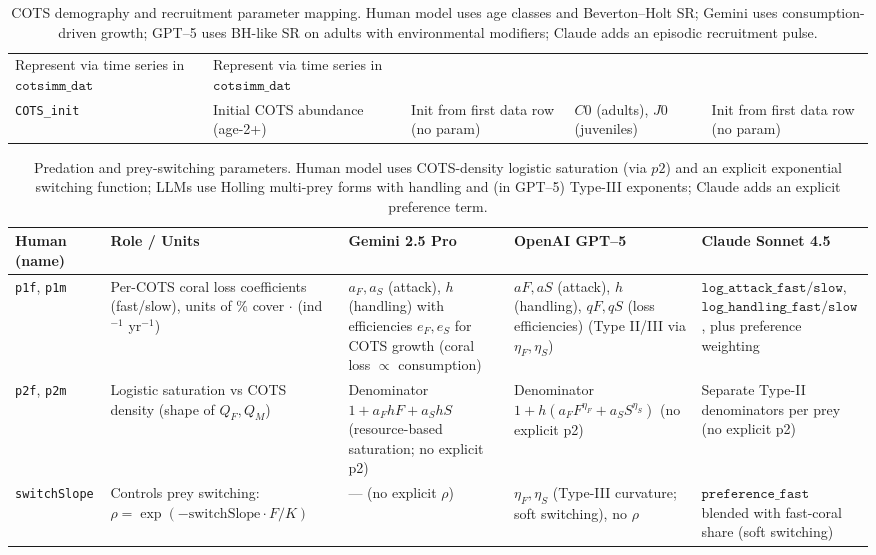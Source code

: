 \begin{landscape}
\begin{table}[htbp]
\begin{tabularx}{\linewidth}{@{}l l l l X@{}}
Represent via time series in $\texttt{cotsimm\_dat}$ &
Represent via time series in $\texttt{cotsimm\_dat}$ \\
\texttt{COTS\_init} & Initial COTS abundance (age-2+) &
Init from first data row (no param) &
$C0$ (adults), $J0$ (juveniles) &
Init from first data row (no param) \\
\bottomrule
\end{tabularx}
\caption{COTS demography and recruitment parameter mapping. Human model uses age classes and Beverton--Holt SR; Gemini uses consumption-driven growth; GPT--5 uses BH-like SR on adults with environmental modifiers; Claude adds an episodic recruitment pulse.}
\label{tab:params_cots}
\end{table}
\end{landscape}

\begin{landscape}
\begin{table}[htbp]
\centering
\footnotesize
\renewcommand{\arraystretch}{1.15}
\setlength{\tabcolsep}{3pt}
\begin{tabularx}{\linewidth}{@{}l l l l X@{}}
\toprule
\textbf{Human (name)} & \textbf{Role / Units} & \textbf{Gemini 2.5 Pro} & \textbf{OpenAI GPT--5} & \textbf{Claude Sonnet 4.5} \\
\midrule
\texttt{p1f}, \texttt{p1m} & Per-COTS coral loss coefficients (fast/slow), units of \% cover $\cdot$ (ind$^{-1}$ yr$^{-1}$) &
$a_F,a_S$ (attack), $h$ (handling) with efficiencies $e_F,e_S$ for COTS growth (coral loss $\propto$ consumption) &
$aF,aS$ (attack), $h$ (handling), $qF,qS$ (loss efficiencies) \quad(Type II/III via $\eta_F,\eta_S$) &
$\texttt{log\_attack\_fast/slow}$, $\texttt{log\_handling\_fast/slow}$, plus preference weighting \\
\texttt{p2f}, \texttt{p2m} & Logistic saturation vs COTS density (shape of $Q_F,Q_M$) &
Denominator $1+a_FhF+a_ShS$ (resource-based saturation; no explicit p2) &
Denominator $1+h(a_FF^{\eta_F}+a_SS^{\eta_S})$ (no explicit p2) &
Separate Type-II denominators per prey (no explicit p2) \\
\texttt{switchSlope} & Controls prey switching: $\rho=\exp(-\text{switchSlope}\cdot F/K)$ &
--- (no explicit $\rho$) &
$\eta_F,\eta_S$ (Type-III curvature; soft switching), no $\rho$ &
$\texttt{preference\_fast}$ blended with fast-coral share (soft switching) \\
\bottomrule
\end{tabularx}
\caption{Predation and prey-switching parameters. Human model uses COTS-density logistic saturation (via $p2$) and an explicit exponential switching function; LLMs use Holling multi-prey forms with handling and (in GPT--5) Type-III exponents; Claude adds an explicit preference term.}
\label{tab:params_predation}
\end{table}
\end{landscape}


